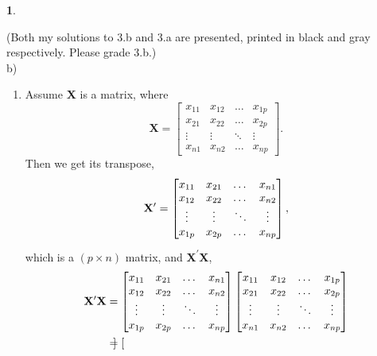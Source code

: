 \documentclass[10pt]{article}
\newtheorem{prob}{\bm{$Problem$}}
\begin{document}
\begin{prob}
\end{prob}
\vspace{3mm}

(Both my solutions to 3.b and 3.a are presented, printed in black and gray respectively. Please grade 3.b.)\\

b)

\begin{enumerate}[1)]
\item
Assume \textbf{X} is a matrix, where
\[
\textbf{X}=
  \begin{bmatrix}
    x_{11} & x_{12} & \dots & x_{1p}\\
    x_{21} & x_{22} & \dots & x_{2p}\\
    \vdots & \vdots & \ddots & \vdots\\
    x_{n1} & x_{n2} & \dots & x_{np}
  \end{bmatrix}
.
\]
Then we get its transpose,%
\[
\textbf{X\textsuperscript{$\prime$}}=
  \begin{bmatrix}
    x_{11} & x_{21} & \dots & x_{n1}\\
    x_{12} & x_{22} & \dots & x_{n2}\\
    \vdots & \vdots & \ddots & \vdots\\
    x_{1p} & x_{2p} & \dots & x_{np}
  \end{bmatrix}
,
\]
which is a $(p\times n)$ matrix, and \textbf{X\textsuperscript{$\prime$}X},
\begin{align*}
\textbf{X\textsuperscript{$\prime$}X}&=
  \begin{bmatrix}
    x_{11} & x_{21} & \dots & x_{n1}\\
    x_{12} & x_{22} & \dots & x_{n2}\\
    \vdots & \vdots & \ddots & \vdots\\
    x_{1p} & x_{2p} & \dots & x_{np}
  \end{bmatrix}
  \begin{bmatrix}
    x_{11} & x_{12} & \dots & x_{1p}\\
    x_{21} & x_{22} & \dots & x_{2p}\\
    \vdots & \vdots & \ddots & \vdots\\
    x_{n1} & x_{n2} & \dots & x_{np}
  \end{bmatrix}
\\
&=
  \begin{bmatrix}

\end{bmatrix}
\end{align*}
\end{enumerate}
\end{document}
